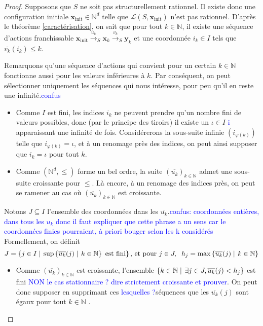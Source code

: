 \documentclass[a4paper,final]{article}
\theoremstyle{definition}
\let\phi\varphi
\let\leq\leqslant
\newcommand{\alain}[1]{\textcolor{blue}{#1}}
\newcommand{\set}[2]{\left\{#1\mathrel{\left|\vphantom{#1}\vphantom{#2}\right.}#2\right\}}
\newcommand{\N}{\ensuremath{\mathbb{N}}}
\newcommand{\lang}{\ensuremath{\mathcal{L}}}
\newcommand{\trans}[2]{\ensuremath{\stackrel{#1}{\longrightarrow}_{#2}}}
\newcommand{\vect}[1]{\ensuremath{\mathbf{#1}}}
\newcommand{\xinit}{\ensuremath{\vect{x}_\text{init}}}
\newcommand{\valeur}[1]{\ensuremath{\overline{#1}}}
\begin{document}
\begin{proof}
Supposons que $S$ ne soit pas structurellement rationnel.
Il existe donc une configuration initiale $\xinit \in\N^d$ telle que $\lang(S,\xinit)$ n'est pas rationnel.
D'après le théorème \ref{caractérisation}, on sait que pour tout $k\in\N$,  il existe une séquence d'actions franchissable 
$\xinit \trans{u_k}{S} \vect{x}_k \trans{v_k}{S} \vect{y}_k$
et une coordonnée $i_k \in I$ tels que $\valeur{v_k}(i_k) \leq k$.

Remarquons qu'une séquence d'actions qui convient pour un certain $k\in\N$ fonctionne aussi pour les valeurs inférieures à $k$.
Par conséquent, on peut sélectionner uniquement les séquences qui nous intéresse, pour peu qu'il en reste une infinité.\alain{confus}

\begin{itemize}
    \item Comme $I$ est fini, les indices $i_k$ ne peuvent prendre qu'un nombre fini de valeurs possibles, donc (par le principe des tiroirs) il existe un $\iota\in I$ \alain{i} apparaissant une infinité de fois.
    Considérerons la sous-suite infinie $(i_{\phi(k)})$ telle que $i_{\phi(k)} = \iota$, et à un renomage près des indices, on peut ainsi supposer que $i_k = \iota$ pour tout $k$.
    
    \item Comme $(\N^d,\leq)$ forme un bel ordre, la suite $(\valeur{u_k})_{k\in\N}$ admet une sous-suite croissante pour $\leq$. Là encore, à un renomage des indices près,
    on peut se ramener au cas où $(\valeur{u_k})_{k\in\N}$ est croissante.
\end{itemize}

Notons $J\subseteq I$ l'ensemble des coordonnées  dans les $\valeur{u_k}$.\alain{confus: coordonnées entières,  dans tous les $u_k$ donc il faut expliquer que cette phrase a un sens car le coordonnées finies pourraient, à priori bouger selon les k considérés}
Formellement, on définit 
$$J = \set{j\in I}{
    \text{sup} \set{\valeur{u_k}(j)}{k\in\N} \text{ est fini}}
\text{, et pour } j\in J,\hspace{2mm} h_j = \max \set{\valeur{u_k}(j)}{k\in\N}$$

\begin{itemize}
    \item Comme $(\valeur{u_k})_{k\in\N}$ est croissante, l'ensemble $\set{k\in\N}{\exists j\in J,\valeur{u_k}(j) < h_j}$ est fini \alain{NON le cas stationnaire ? dire strictement croissante et prouver}.
    On peut donc supposer en supprimant ces \alain{lesquelles ?}séquences que les $\valeur{u_k}(j)$ sont égaux pour tout $k\in\N$ .
    

\end{itemize}
\end{proof}
\end{document}
